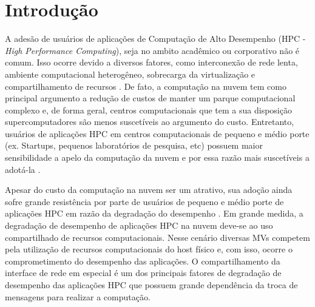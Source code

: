 \documentclass[10pt, conference, compsocconf]{IEEEtran}
\begin{document}
\section{Introdução}
A adesão de usuários de aplicações de Computação de Alto Desempenho (HPC - \emph{High Performance Computing}), seja no ambito acadêmico ou corporativo não é comum. Isso ocorre devido a diversos fatores, como interconexão de rede lenta, ambiente computacional heterogêneo, sobrecarga da virtualização e compartilhamento de recursos \cite{Gupta:2014}. De fato, a computação na nuvem tem como principal argumento a redução de custos de manter um parque computacional complexo e, de forma geral, centros computacionais que tem a sua disposição supercomputadores são menos suscetíveis ao argumento do custo. Entretanto, usuários de aplicações HPC em centros computacionais de pequeno e médio porte (ex. Startups, pequenos laboratórios de pesquisa, etc) possuem maior sensibilidade a apelo da computação da nuvem e por essa razão mais suscetíveis a adotá-la \cite{Gupta:2014} \cite{Gupta:2013}.

Apesar do custo da computação na nuvem ser um atrativo, sua adoção ainda sofre grande resistência por parte de usuários de pequeno e médio porte de aplicações HPC em razão da degradação do desempenho \cite{Niu:2013}. Em grande medida, a degradação de desempenho de aplicações HPC na nuvem deve-se ao uso compartilhado de recursos computacionais. Nesse cenário diversas MVs competem pela utilização de recursos computacionais do host físico e, com isso, ocorre o comprometimento do desempenho das aplicações. O compartilhamento da interface de rede em especial é um dos principais fatores de degradação de desempenho \cite{Gupta:2014} das aplicações HPC que possuem grande dependência da troca de mensagens para realizar a computação.
\end{document}
